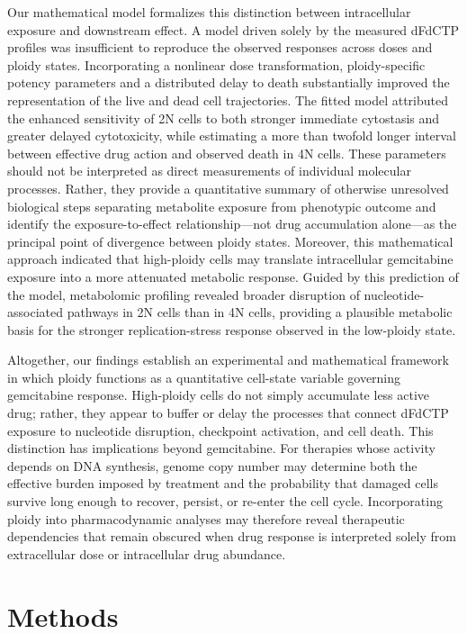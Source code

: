 \documentclass[11pt,notitlepage]{article}
\begin{document}
Our mathematical model formalizes this distinction between intracellular exposure and downstream effect. A model driven solely by the measured dFdCTP profiles was insufficient to reproduce the observed responses across doses and ploidy states. Incorporating a nonlinear dose transformation, ploidy-specific potency parameters and a distributed delay to death substantially improved the representation of the live and dead cell trajectories. The fitted model attributed the enhanced sensitivity of 2N cells to both stronger immediate cytostasis and greater delayed cytotoxicity, while estimating a more than twofold longer interval between effective drug action and observed death in 4N cells. These parameters should not be interpreted as direct measurements of individual molecular processes. Rather, they provide a quantitative summary of otherwise unresolved biological steps separating metabolite exposure from phenotypic outcome and identify the exposure-to-effect relationship—not drug accumulation alone—as the principal point of divergence between ploidy states. Moreover, this mathematical approach indicated that high-ploidy cells may translate intracellular gemcitabine exposure into a more attenuated metabolic response. Guided by this prediction of the model, metabolomic profiling revealed broader disruption of nucleotide-associated pathways in 2N cells than in 4N cells, providing a plausible metabolic basis for the stronger replication-stress response observed in the low-ploidy state. 

Altogether, our findings establish an experimental and mathematical framework in which ploidy functions as a quantitative cell-state variable governing gemcitabine response. High-ploidy cells do not simply accumulate less active drug; rather, they appear to buffer or delay the processes that connect dFdCTP exposure to nucleotide disruption, checkpoint activation, and cell death. This distinction has implications beyond gemcitabine. For therapies whose activity depends on DNA synthesis, genome copy number may determine both the effective burden imposed by treatment and the probability that damaged cells survive long enough to recover, persist, or re-enter the cell cycle. Incorporating ploidy into pharmacodynamic analyses may therefore reveal therapeutic dependencies that remain obscured when drug response is interpreted solely from extracellular dose or intracellular drug abundance.


\section{Methods}
\end{document}
